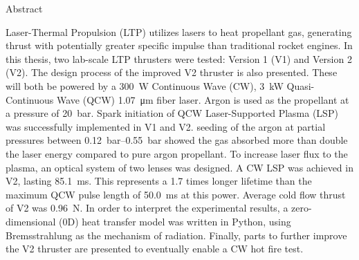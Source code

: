 \begin{plainchp}{Abstract}
    
    Laser-Thermal Propulsion (LTP) utilizes lasers to heat propellant gas, generating thrust with potentially greater specific impulse than traditional rocket engines. In this thesis, two lab-scale LTP thrusters were tested: Version 1 (V1) and Version 2 (V2). The design process of the improved V2 thruster is also presented. These will both be powered by a \qty{300}{W} Continuous Wave (CW), \qty{3}{kW} Quasi-Continuous Wave (QCW) \qty{1.07}{μm} fiber laser. Argon is used as the propellant at a pressure of \qty{20}{bar}. Spark initiation of QCW Laser-Supported Plasma (LSP) was successfully implemented in V1 and V2.  seeding of the argon at partial pressures between \qtyrange{.12}{.55}{bar} showed the gas absorbed more than double the laser energy compared to pure argon propellant. To increase laser flux to the plasma, an optical system of two lenses was designed. A CW LSP was achieved in V2, lasting \qty{85.1}{ms}. This represents a 1.7 times longer lifetime than the maximum QCW pulse length of \qty{50.0}{ms} at this power. Average cold flow thrust of V2 was \qty{0.96}{N}. In order to interpret the experimental results, a zero-dimensional (0D) heat transfer model was written in Python, using Bremsstrahlung as the mechanism of radiation. Finally, parts to further improve the V2 thruster are presented to eventually enable a CW hot fire test.

\end{plainchp}